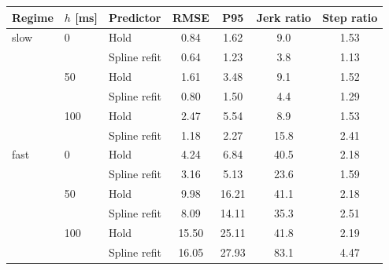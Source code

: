 \begin{tabular}{lllcccc}
\hline
Regime & $h$ [ms] & Predictor & RMSE & P95 & Jerk ratio & Step ratio \\
\hline
slow & 0 & Hold & 0.84 & 1.62 & 9.0 & 1.53 \\
 &  & Spline refit & 0.64 & 1.23 & 3.8 & 1.13 \\
 & 50 & Hold & 1.61 & 3.48 & 9.1 & 1.52 \\
 &  & Spline refit & 0.80 & 1.50 & 4.4 & 1.29 \\
 & 100 & Hold & 2.47 & 5.54 & 8.9 & 1.53 \\
 &  & Spline refit & 1.18 & 2.27 & 15.8 & 2.41 \\
\hline
fast & 0 & Hold & 4.24 & 6.84 & 40.5 & 2.18 \\
 &  & Spline refit & 3.16 & 5.13 & 23.6 & 1.59 \\
 & 50 & Hold & 9.98 & 16.21 & 41.1 & 2.18 \\
 &  & Spline refit & 8.09 & 14.11 & 35.3 & 2.51 \\
 & 100 & Hold & 15.50 & 25.11 & 41.8 & 2.19 \\
 &  & Spline refit & 16.05 & 27.93 & 83.1 & 4.47 \\
\hline
\end{tabular}
